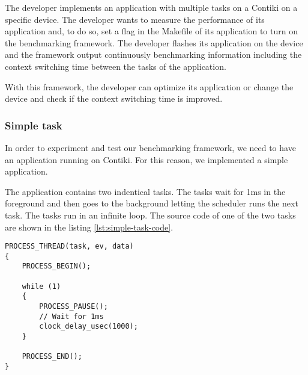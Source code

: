 The developer implements an application with multiple tasks on a Contiki on a specific device.
The developer wants to measure the performance of its application and, to do so, set a flag in the Makefile of its application to turn on the benchmarking framework.
The developer flashes its application on the device and the framework output continuously benchmarking information including the context switching time between the tasks of the application.

With this framework, the developer can optimize its application or change the device and check if the context switching time is improved.

\subsubsection{Simple task}
In order to experiment and test our benchmarking framework, we need to have an application running on Contiki.
For this reason, we implemented a simple application.

The application contains two indentical tasks.
The tasks wait for 1ms in the foreground and then goes to the background letting the scheduler runs the next task.
The tasks run in an infinite loop.
The source code of one of the two tasks are shown in the listing \ref{lst:simple-task-code}.

\begin{lstlisting}[style=CStyle, label={lst:simple-task-code}, caption={Source code of a task implemented in Contiki for the simple application}]
PROCESS_THREAD(task, ev, data)
{
    PROCESS_BEGIN();

    while (1)
    {
        PROCESS_PAUSE();
        // Wait for 1ms
        clock_delay_usec(1000);
    }

    PROCESS_END();
}
\end{lstlisting}